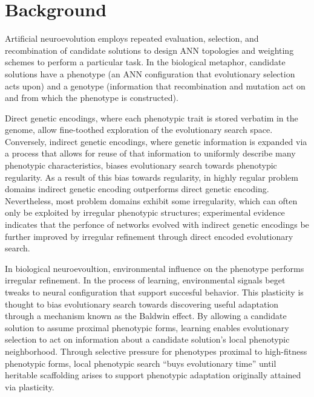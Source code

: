 \section{Background}

Artificial neuroevolution employs repeated evaluation, selection, and recombination of candidate solutions to design ANN topologies and weighting schemes to perform a particular task.
In the biological metaphor, candidate solutions have a phenotype (an ANN configuration that evolutionary selection acts upon) and a genotype (information that recombination and mutation act on and from which the phenotype is constructed).

Direct genetic encodings, where each phenotypic trait is stored verbatim in the genome, allow fine-toothed exploration of the evolutionary search space.
Conversely, indirect genetic encodings, where genetic information is expanded via a process that allows for reuse of that information to uniformly describe many phenotypic characteristics, biases evolutionary search towards phenotypic regularity.\autocite{Clune2011OnRegularity}
As a result of this bias towards regularity, in highly regular problem domains indirect genetic encoding outperforms direct genetic encoding.\autocite{Clune2011OnRegularity}
Nevertheless, most problem domains exhibit some irregularity, which can often only be exploited by irregular phenotypic structures;
experimental evidence indicates that the perfonce of networks evolved with indirect genetic encodings be further improved by irregular refinement through direct encoded evolutionary search.\autocite{Clune2011OnRegularity}

In biological neuroevoultion, environmental influence on the phenotype performs irregular refinement.\autocite{Clune2011OnRegularity}
In the process of learning, environmental signals beget tweaks to neural configuration that support succesful behavior.
This plasticity is thought to bias evolutionary search towards discovering useful adaptation through a mechanism known as the Baldwin effect.\autocite{Downing2010TheNetworks}
By allowing a candidate solution to assume proximal phenotypic forms, learning enables evolutionary selection to act on information about a candidate solution's local phenotypic neighborhood.
Through selective pressure for phenotypes proximal to high-fitness phenotypic forms, local phenotypic search ``buys evolutionary time'' until heritable scaffolding arises to support phenotypic adaptation originally attained via plasticity.\autocite{Downing2010TheNetworks}
